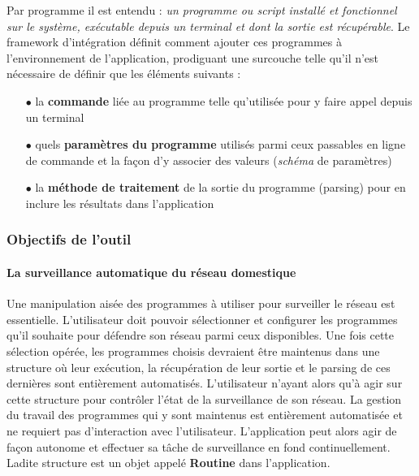 \documentclass[]{article}
\begin{document}
\par Par programme il est entendu : \textit{un programme ou script installé et fonctionnel sur le système, exécutable depuis un terminal et dont la sortie est récupérable}. Le framework d'intégration définit comment ajouter ces programmes à l'environnement de l'application, prodiguant une surcouche telle qu'il n'est nécessaire de définir que les éléments suivants :\\
\begin{itemize}
\item[$\bullet$] la \textbf{commande} liée au programme telle qu'utilisée pour y faire appel depuis un terminal
\vspace{0.2cm}
\item[$\bullet$] quels \textbf{paramètres du programme} utilisés parmi ceux passables en ligne de commande et la façon d'y associer des valeurs (\textit{schéma} de paramètres)
\vspace{0.2cm}
\item[$\bullet$] la \textbf{méthode de traitement} de la sortie du programme (parsing) pour en inclure les résultats dans l'application
\end{itemize}


\vspace{0.2cm}

\subsubsection{Objectifs de l'outil}

\paragraph{La surveillance automatique du réseau domestique}

Une manipulation aisée des programmes à utiliser pour surveiller le réseau est essentielle. L'utilisateur doit pouvoir sélectionner et configurer les programmes qu'il souhaite pour défendre son réseau parmi ceux disponibles. Une fois cette sélection opérée, les programmes choisis devraient être maintenus dans une structure où leur exécution, la récupération de leur sortie et le parsing de ces dernières sont entièrement automatisés. L'utilisateur n'ayant alors qu'à agir sur cette structure pour contrôler l'état de la surveillance de son réseau. La gestion du travail des programmes qui y sont maintenus est entièrement automatisée et ne requiert pas d'interaction avec l'utilisateur. L'application peut alors agir de façon autonome et effectuer sa tâche de surveillance en fond continuellement. Ladite structure est un objet appelé \textbf{Routine} dans l'application.
\end{document}

